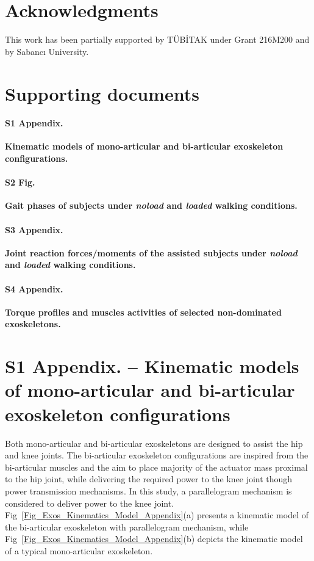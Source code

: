 \documentclass[10pt,letterpaper]{article}
\begin{document}
\section*{Acknowledgments}

This work has been partially supported  by T\"{U}B\.{I}TAK under Grant 216M200 and by Sabanc{\i} University.
\bigskip
\section*{Supporting documents}

\paragraph*{S1 Appendix.}
\label{S1_Appendix}
{\bf Kinematic models of mono-articular and bi-articular exoskeleton configurations.}

\paragraph*{S2 Fig.}
\label{S2_Appendix}
{\bf Gait phases of subjects under \textit{noload} and \textit{loaded} walking conditions.}

\paragraph*{S3 Appendix.}
\label{S3_Appendix}
{\bf Joint reaction forces/moments of the assisted subjects under \textit{noload} and \textit{loaded} walking conditions.}

\paragraph*{S4 Appendix.}
\label{S4_Appendix}
{\bf Torque profiles and muscles activities of selected non-dominated exoskeletons.}



\newpage
\nolinenumbers
\section*{S1 Appendix. -- Kinematic models of mono-articular and bi-articular exoskeleton configurations} %
\nolinenumbers
\renewcommand{\thefigure}{A\arabic{figure}}
\setcounter{figure}{0}
Both mono-articular and bi-articular exoskeletons are designed to assist the hip and knee joints. The bi-articular exoskeleton configurations are inspired from the bi-articular muscles and the aim to place majority of the actuator mass proximal to the hip joint, while delivering the required power to the knee joint though power transmission mechanisms. In this study, a parallelogram mechanism is considered to deliver power to the knee joint. Fig~\ref{Fig_Exos_Kinematics_Model_Appendix}(a) presents a kinematic model of the bi-articular exoskeleton with parallelogram mechanism, while Fig~\ref{Fig_Exos_Kinematics_Model_Appendix}(b) depicts the kinematic model of a typical mono-articular exoskeleton.
\end{document}
